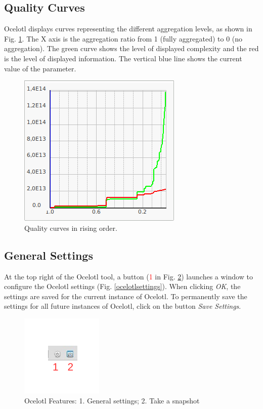 \documentclass[twoside]{article}
\begin{document}
\begin{sloppypar}
\subsection{Quality Curves}
Ocelotl displays curves representing the different aggregation levels, as shown in Fig. \ref{aggregCurves}. The X axis is the aggregation ratio from 1 (fully aggregated) to 0 (no aggregation). %
The green curve shows the level of displayed complexity and the red is the level of displayed information. 
The vertical blue line shows the current value of the parameter.

\begin{figure}[h!]
	\centering
	\includegraphics[scale=0.5]{images/ocelotlCurves.png}
	\caption{Quality curves in rising order.}
	\label{aggregCurves}
\end{figure}

\subsection{General Settings}
At the top right of the Ocelotl tool, a button (\textcolor{red}{1} in Fig. \ref{ocelotlButtons}) launches a window to configure the Ocelotl settings (Fig. \ref{ocelotlsettings}). When clicking \textit{OK}, the settings are saved for the current instance of Ocelotl. To permanently save the settings for all future instances of Ocelotl, click on the button \textit{Save Settings}.

\begin{figure}[h!]
	\centering
	\includegraphics[scale=1.5]{images/ocelotlButtons.pdf}
	\caption{Ocelotl Features: 1. General settings; 2. Take a snapshot}
	\label{ocelotlButtons}
\end{figure}


\end{sloppypar}
\end{document}
